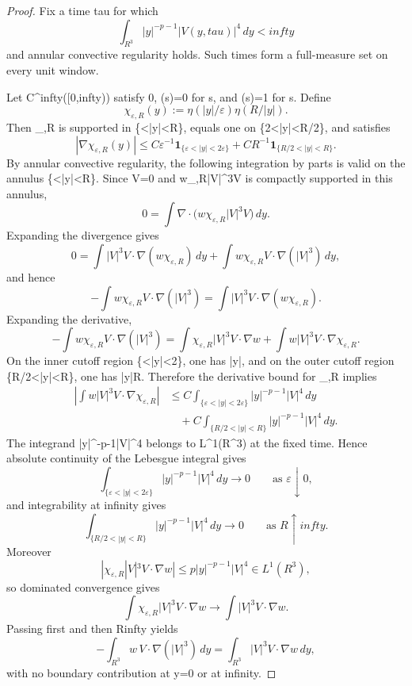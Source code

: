 \documentclass[11pt]{amsart}
\def\({}%
\def\){}%
\def\mathbb#1{#1}%
\def\tau{tau}%
\def\infty{infty}%
\theoremstyle{plain}
\theoremstyle{definition}
\theoremstyle{remark}
\begin{document}
\begin{proof}
Fix a time \(\tau\) for which
\[
  \int_{\mathbb R^3}|y|^{-p-1}|V(y,\tau)|^4\,dy<\infty
\]
and annular convective regularity holds.  Such times form a full-measure set
on every unit window.

Let \(\eta\in C^\infty([0,\infty))\) satisfy \(0\le\eta{}\),
\(\eta(s)=0\) for \(s\), and \(\eta(s)=1\) for \(s\).  Define
\[
  \chi_{\varepsilon,R}(y)
  :=
  \eta(|y|/\varepsilon)\eta(R/|y|).
\]
Then \(\chi_{\varepsilon,R}\) is supported in
\(\{\varepsilon<|y|<R\}\), equals one on
\(\{2\varepsilon<|y|<R/2\}\), and satisfies
\[
  |\nabla\chi_{\varepsilon,R}(y)|
  \le
  C\varepsilon^{-1}\mathbf 1_{\{\varepsilon<|y|<2\varepsilon\}}
  +CR^{-1}\mathbf 1_{\{R/2<|y|<R\}}.
\]
By annular convective regularity, the following integration by parts is valid
on the annulus \(\{\varepsilon<|y|<R\}\).  Since
\(\nabla\cdot V=0\) and \(w\chi_{\varepsilon,R}|V|^3V\) is compactly
supported in this annulus,
\[
  0
  =
  \int \nabla\cdot\bigl(w\chi_{\varepsilon,R}|V|^3V\bigr)\,dy .
\]
Expanding the divergence gives
\[
  0
  =
  \int |V|^3V\cdot\nabla(w\chi_{\varepsilon,R})\,dy
  +
  \int w\chi_{\varepsilon,R}V\cdot\nabla(|V|^3)\,dy ,
\]
and hence
\[
  -\int w\chi_{\varepsilon,R}V\cdot\nabla(|V|^3)
  =
  \int |V|^3V\cdot\nabla(w\chi_{\varepsilon,R}).
\]
Expanding the derivative,
\[
  -\int w\chi_{\varepsilon,R}V\cdot\nabla(|V|^3)
  =
  \int \chi_{\varepsilon,R}|V|^3V\cdot\nabla w
  +\int w|V|^3V\cdot\nabla\chi_{\varepsilon,R}.
\]
On the inner cutoff region \(\{\varepsilon<|y|<2\varepsilon\}\), one has
\(|y|\simeq\varepsilon\), and on the outer cutoff region
\(\{R/2<|y|<R\}\), one has \(|y|\simeq R\).  Therefore the derivative bound
for \(\chi_{\varepsilon,R}\) implies
\[
\begin{aligned}
  \left|
  \int w|V|^3V\cdot\nabla\chi_{\varepsilon,R}
  \right|
  &\le
  C\int_{\{\varepsilon<|y|<2\varepsilon\}}
  |y|^{-p-1}|V|^4\,dy \\
  &\quad{}
  +C\int_{\{R/2<|y|<R\}}
  |y|^{-p-1}|V|^4\,dy .
\end{aligned}
\]
The integrand \(|y|^{-p-1}|V|^4\) belongs to \(L^1(\mathbb R^3)\) at the
fixed time.  Hence absolute continuity of the Lebesgue integral gives
\[
  \int_{\{\varepsilon<|y|<2\varepsilon\}}
  |y|^{-p-1}|V|^4\,dy\to0
  \qquad\text{as }\varepsilon\downarrow0,
\]
and integrability at infinity gives
\[
  \int_{\{R/2<|y|<R\}}
  |y|^{-p-1}|V|^4\,dy\to0
  \qquad\text{as }R\uparrow\infty.
\]
Moreover
\[
  |\chi_{\varepsilon,R}|V|^3V\cdot\nabla w|
  \le
  p|y|^{-p-1}|V|^4\in L^1(\mathbb R^3),
\]
so dominated convergence gives
\[
  \int \chi_{\varepsilon,R}|V|^3V\cdot\nabla w
  \to
  \int |V|^3V\cdot\nabla w.
\]
Passing first \(\varepsilon{}\) and then \(R\uparrow\infty\) yields
\[
  -\int_{\mathbb R^3}w\,V\cdot\nabla(|V|^3)\,dy
  =
  \int_{\mathbb R^3}|V|^3V\cdot\nabla w\,dy,
\]
with no boundary contribution at \(y=0\) or at infinity.
\end{proof}
\end{document}
